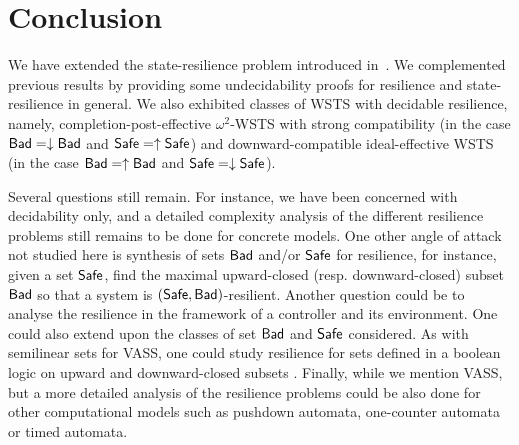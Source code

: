



\section{Conclusion}


We have extended the state-resilience problem introduced in~\cite{DBLP:journals/corr/PrasadZ16,DBLP:journals/corr/abs-2108-00889,DBLP:conf/gg/Ozkan22}.
We complemented previous results by providing some undecidability proofs for resilience and state-resilience in general. We also exhibited classes of WSTS with decidable resilience, namely, 
completion-post-effective $\omega^2$-WSTS with strong compatibility (in the case $\textsf{Bad} = \downarrow \textsf{Bad}$ and $\textsf{Safe} = \uparrow \textsf{Safe}$) and 
downward-compatible
ideal-effective WSTS
(in the case $\textsf{Bad} = \uparrow \textsf{Bad}$ and $\textsf{Safe} = \downarrow \textsf{Safe}$).

Several questions still remain.
For instance, we have been concerned with decidability only, and a detailed complexity analysis of the different resilience problems still remains to be done for concrete models. 
One other angle of attack not studied here is synthesis of sets $\textsf{Bad}$ and/or $\textsf{Safe}$ for resilience,
for instance, given a set $\textsf{Safe}$, find the maximal upward-closed (resp. downward-closed) subset 
$\textsf{Bad}$ so that a system is $(\textsf{Safe},\textsf{Bad})$-resilient. 
Another question could be to analyse the resilience in the framework of a controller and its environment. 
One could also extend upon the classes of set $\textsf{Bad}$ and $\textsf{Safe}$ considered. As with semilinear sets for VASS, one could study resilience for sets defined in a boolean logic on upward and downward-closed subsets \cite{DBLP:journals/fmsd/BertrandS13}. Finally, while we mention VASS, but a more detailed analysis of the resilience problems could be also done for other computational models such as pushdown automata, one-counter automata or timed automata.


%
%
%
%



